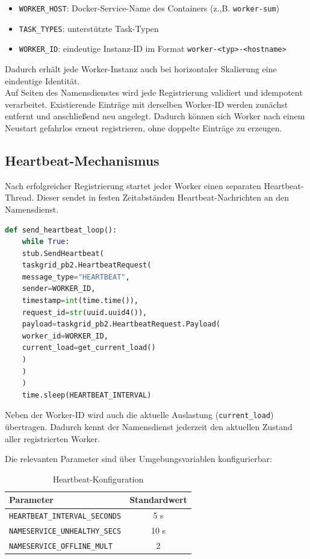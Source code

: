 \begin{itemize}
	\item \texttt{WORKER\_HOST}: Docker-Service-Name des Containers (z.,B. \texttt{worker-sum})
	\item \texttt{TASK\_TYPES}: unterstützte Task-Typen
	\item \texttt{WORKER\_ID}: eindeutige Instanz-ID im Format \texttt{worker-<typ>-<hostname>}
\end{itemize}
Dadurch erhält jede Worker-Instanz auch bei horizontaler Skalierung eine eindeutige Identität.
\\
Auf Seiten des Namensdienstes wird jede Registrierung validiert und idempotent verarbeitet.
Existierende Einträge mit derselben Worker-ID werden zunächst entfernt und anschließend neu angelegt.
Dadurch können sich Worker nach einem Neustart gefahrlos erneut registrieren, ohne doppelte Einträge zu erzeugen.

\subsection{Heartbeat-Mechanismus}

Nach erfolgreicher Registrierung startet jeder Worker einen separaten Heartbeat-Thread.
Dieser sendet in festen Zeitabständen Heartbeat-Nachrichten an den Namensdienst.

\begin{lstlisting}[language=Python,caption={Heartbeat-Loop (worker.py)}]
	def send_heartbeat_loop():
	while True:
	stub.SendHeartbeat(
	taskgrid_pb2.HeartbeatRequest(
	message_type="HEARTBEAT",
	sender=WORKER_ID,
	timestamp=int(time.time()),
	request_id=str(uuid.uuid4()),
	payload=taskgrid_pb2.HeartbeatRequest.Payload(
	worker_id=WORKER_ID,
	current_load=get_current_load()
	)
	)
	)
	time.sleep(HEARTBEAT_INTERVAL)
\end{lstlisting}

Neben der Worker-ID wird auch die aktuelle Auslastung (\texttt{current\_load}) übertragen.
Dadurch kennt der Namensdienst jederzeit den aktuellen Zustand aller registrierten Worker.

Die relevanten Parameter sind über Umgebungsvariablen konfigurierbar:

\begin{table}[H]
	\centering
	\begin{tabular}{l c}
		\toprule
		Parameter & Standardwert \\
		\midrule
		\texttt{HEARTBEAT\_INTERVAL\_SECONDS} & 5 s \\
		\texttt{NAMESERVICE\_UNHEALTHY\_SECS} & 10 s \\
		\texttt{NAMESERVICE\_OFFLINE\_MULT} & 2 \\
		\bottomrule
	\end{tabular}
	\caption{Heartbeat-Konfiguration}
\end{table}

